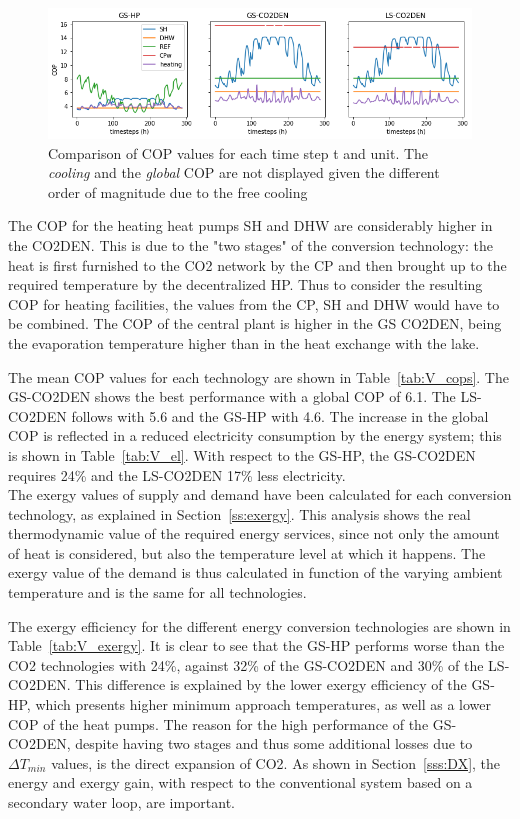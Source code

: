 \documentclass{article}
\begin{document}
\begin{figure}[tph]
	\centering
	\includegraphics[width=1\linewidth]{Images/V_COP}
	\caption{Comparison of COP values for each time step t and unit. The \textit{cooling } and the \textit{global} COP are not displayed given the different order of magnitude due to the free cooling}
	\label{fig:v_cop}
\end{figure}

The COP for the heating heat pumps SH and DHW are considerably higher in the CO2DEN. This is due to the "two stages" of the conversion technology: the heat is first furnished to the CO2 network by the CP and then brought up to the required temperature by the decentralized HP. Thus to consider the resulting COP for heating facilities, the values from the CP, SH and DHW would have to be combined. The COP of the central plant is higher in the GS CO2DEN, being the evaporation temperature higher than in the heat exchange with the lake. 



The mean COP values for each technology are shown in Table~\ref{tab:V_cops}. The GS-CO2DEN shows the best performance with a global COP of 6.1. The LS-CO2DEN follows with 5.6 and the GS-HP with 4.6. The increase in the global COP is reflected in a reduced electricity consumption by the energy system; this is shown in Table~\ref{tab:V_el}. With respect to the GS-HP, the GS-CO2DEN requires 24\% and the LS-CO2DEN 17\% less electricity.\\



The exergy values of supply and demand have been calculated for each conversion technology, as explained in Section~\ref{ss:exergy}. This analysis shows the real thermodynamic value of the required energy services, since not only the amount of heat is considered, but also the temperature level at which it happens. The exergy value of the demand is thus calculated in function of the varying ambient temperature and is the same for all technologies.

The exergy efficiency for the different energy conversion technologies are shown in Table~\ref{tab:V_exergy}. It is clear to see that the GS-HP performs worse than the CO2 technologies with 24\%, against 32\% of the GS-CO2DEN and 30\% of the LS-CO2DEN. This difference is explained by the lower exergy efficiency of the GS-HP, which presents higher minimum approach temperatures, as well as a lower COP of the heat pumps. The reason for the high performance of the GS-CO2DEN, despite having two stages and thus some additional losses due to $\Delta T_{min}$ values, is the direct expansion of CO2. As shown in Section~\ref{sss:DX}, the energy and exergy gain, with respect to the conventional system based on a secondary water loop, are important.
\end{document}
